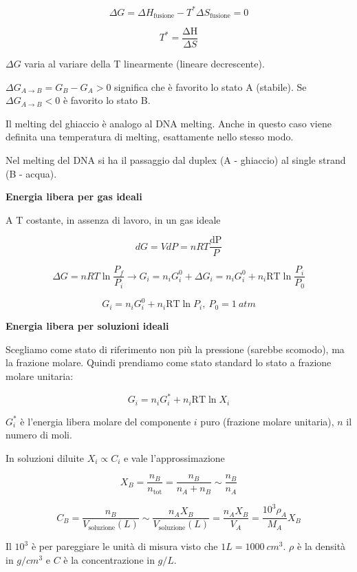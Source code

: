\[\Delta G = \Delta H_{\text{fusione}} - T^{*}\Delta S_{\text{fusione}} = 0\]

\[T^{*} = \frac{\text{ΔH}}{\Delta S}\]

\(\Delta G\) varia al variare della T linearmente (lineare decrescente).

\(\Delta G_{A \rightarrow B} = G_{B} - G_{A} > 0\) significa che è
favorito lo stato A (stabile). Se \(\Delta G_{A \rightarrow B} < 0\) è
favorito lo stato B.

Il melting del ghiaccio è analogo al DNA melting. Anche in questo caso
viene definita una temperatura di melting, esattamente nello stesso
modo.

Nel melting del DNA si ha il passaggio dal duplex (A - ghiaccio) al
single strand (B - acqua).

\textbf{Energia libera per gas ideali}

A T costante, in assenza di lavoro, in un gas ideale

\[dG = VdP = nRT\frac{\text{dP}}{P}\]

\[\Delta G = nRT\ln\frac{P_{f}}{P_{i}} \rightarrow G_{i} = n_{i}G_{i}^{0} + \Delta G_{i} = n_{i}G_{i}^{0} + n_{i}\text{RT}\ln\frac{P_{i}}{P_{0}}\]

\[G_{i} = n_{i}G_{i}^{0} + n_{i}\text{RT}\ln P_{i},\ P_{0} = 1\ atm\]

\textbf{Energia libera per soluzioni ideali}

Scegliamo come stato di riferimento non più la pressione (sarebbe
scomodo), ma la frazione molare. Quindi prendiamo come stato standard lo
stato a frazione molare unitaria:

\[G_{i} = n_{i}G_{i}^{*} + n_{i}\text{RT}\ln X_{i}\]

\(G_{i}^{*}\) è l'energia libera molare del componente \(i\) puro
(frazione molare unitaria), \(n\) il numero di moli.

In soluzioni diluite \(X_{i} \propto C_{i}\) e vale l'approssimazione

\[X_{B} = \frac{n_{B}}{n_{\text{tot}}} = \frac{n_{B}}{n_{A} + n_{B}} \sim \frac{n_{B}}{n_{A}}\]

\[C_{B} = \frac{n_{B}}{V_{\text{soluzione}}\left( L \right)} \sim \frac{n_{A}X_{B}}{V_{\text{soluzione}}\left( L \right)} = \frac{n_{A}X_{B}}{V_{A}} = \frac{10^{3}\rho_{A}}{M_{A}}X_{B}\]

Il \(10^{3}\) è per pareggiare le unità di misura visto che
\(1L = 1000\ cm^{3}\). \(\rho\) è la densità in \(g/cm^{3}\) e \(C\) è
la concentrazione in \(g/L\).

